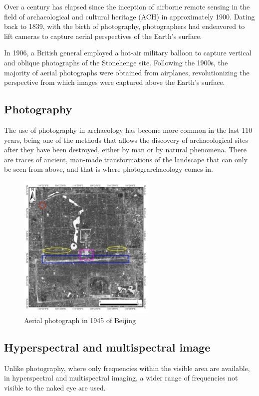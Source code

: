 Over a century has elapsed since the inception of airborne remote sensing in the field of archaeological and cultural heritage (ACH) in approximately 1900. Dating back to 1839, with the birth of photography, photographers had endeavored to lift cameras to capture aerial perspectives of the Earth's surface.

In 1906, a British general employed a hot-air military balloon to capture vertical and oblique photographs of the Stonehenge site\cite{asmr}. Following the 1900s, the majority of aerial photographs were obtained from airplanes, revolutionizing the perspective from which images were captured above the Earth's surface.


\subsection{Photography}
The use of photography in archaeology has become more common in the last 110 years, being one of the methods that allows the discovery of archaeological sites after they have been destroyed, either by man or by natural phenomena. 
There are traces of ancient, man-made transformations of the landscape that can only be seen from above, and that is where photograrchaeology comes in.

\begin{figure}[h]
\centering
\includegraphics[height=7cm]{images/foto.png}
\caption{Aerial photograph in 1945 of Beijing \cite{asmr}}
\end{figure}

\subsection{Hyperspectral and multispectral image}
Unlike photography, where only frequencies within the visible area are available, in hyperspectral and multispectral imaging, a wider range of frequencies not visible to the naked eye are used.


